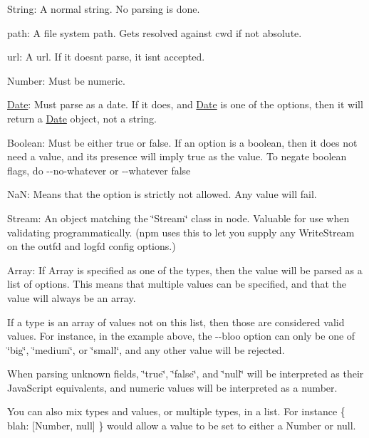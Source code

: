 \begin{DoxyItemize}
\item String\+: A normal string. No parsing is done.
\item path\+: A file system path. Gets resolved against cwd if not absolute.
\item url\+: A url. If it doesn\textquotesingle{}t parse, it isn\textquotesingle{}t accepted.
\item Number\+: Must be numeric.
\item \mbox{\hyperlink{classDate}{Date}}\+: Must parse as a date. If it does, and {\ttfamily \mbox{\hyperlink{classDate}{Date}}} is one of the options, then it will return a \mbox{\hyperlink{classDate}{Date}} object, not a string.
\item Boolean\+: Must be either {\ttfamily true} or {\ttfamily false}. If an option is a boolean, then it does not need a value, and its presence will imply {\ttfamily true} as the value. To negate boolean flags, do {\ttfamily -\/-\/no-\/whatever} or {\ttfamily -\/-\/whatever false}
\item NaN\+: Means that the option is strictly not allowed. Any value will fail.
\item Stream\+: An object matching the \char`\"{}\+Stream\char`\"{} class in node. Valuable for use when validating programmatically. (npm uses this to let you supply any Write\+Stream on the {\ttfamily outfd} and {\ttfamily logfd} config options.)
\item Array\+: If {\ttfamily Array} is specified as one of the types, then the value will be parsed as a list of options. This means that multiple values can be specified, and that the value will always be an array.
\end{DoxyItemize}

If a type is an array of values not on this list, then those are considered valid values. For instance, in the example above, the {\ttfamily -\/-\/bloo} option can only be one of {\ttfamily \char`\"{}big\char`\"{}}, {\ttfamily \char`\"{}medium\char`\"{}}, or {\ttfamily \char`\"{}small\char`\"{}}, and any other value will be rejected.

When parsing unknown fields, {\ttfamily \char`\"{}true\char`\"{}}, {\ttfamily \char`\"{}false\char`\"{}}, and {\ttfamily \char`\"{}null\char`\"{}} will be interpreted as their Java\+Script equivalents, and numeric values will be interpreted as a number.

You can also mix types and values, or multiple types, in a list. For instance {\ttfamily \{ blah\+: \mbox{[}Number, null\mbox{]} \}} would allow a value to be set to either a Number or null.

